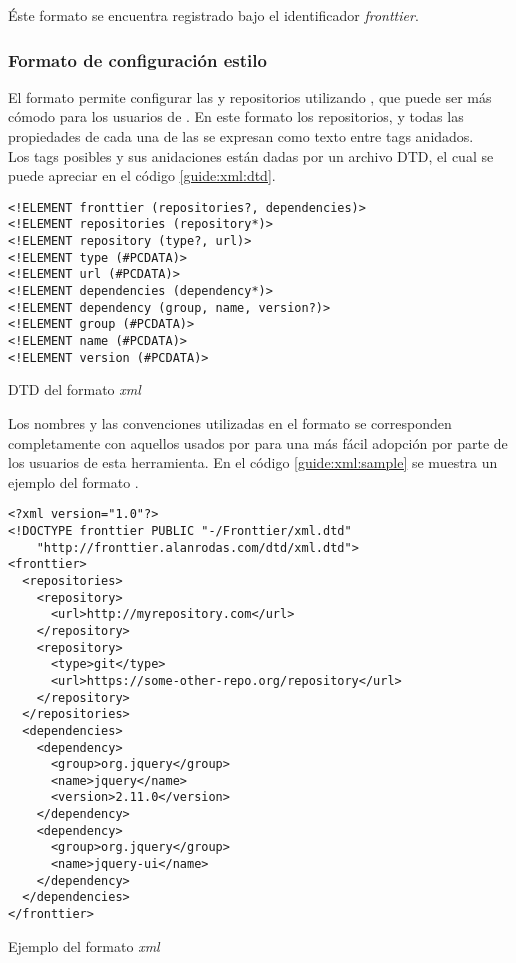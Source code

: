 Éste formato se encuentra registrado bajo el identificador \emph{fronttier}.

\subsubsection{Formato de configuración estilo \maven}
\label{subsubsec:formats:mvn}

El formato \xml permite configurar las \dependencies y repositorios utilizando 
\xml, que puede ser más cómodo para los usuarios de \maven. En este 
formato los repositorios, \dependencies y todas las propiedades de cada una de 
las \dependencies se expresan como texto entre tags \xml anidados.\\
Los tags posibles y sus anidaciones están dadas por un archivo DTD, el cual se 
puede apreciar en el código \ref{guide:xml:dtd}.

\begin{listing}[ht]
	\begin{verbatim}
<!ELEMENT fronttier (repositories?, dependencies)>
<!ELEMENT repositories (repository*)>
<!ELEMENT repository (type?, url)>
<!ELEMENT type (#PCDATA)>
<!ELEMENT url (#PCDATA)>
<!ELEMENT dependencies (dependency*)>
<!ELEMENT dependency (group, name, version?)>
<!ELEMENT group (#PCDATA)>
<!ELEMENT name (#PCDATA)>
<!ELEMENT version (#PCDATA)>
	\end{verbatim}
	\caption{DTD del formato \emph{xml}}
	\label{guide:xml:dtd}
\end{listing}

Los nombres y las convenciones utilizadas en el formato se corresponden 
completamente con aquellos usados por \apache \maven para una más fácil 
adopción por parte de los usuarios de esta herramienta. En el código 
\ref{guide:xml:sample} se muestra un ejemplo del formato .

\begin{listing}[ht]
	\begin{verbatim}
<?xml version="1.0"?>
<!DOCTYPE fronttier PUBLIC "-/Fronttier/xml.dtd"
    "http://fronttier.alanrodas.com/dtd/xml.dtd">
<fronttier>
  <repositories>
    <repository>
      <url>http://myrepository.com</url>
    </repository>
    <repository>
      <type>git</type>
      <url>https://some-other-repo.org/repository</url>
    </repository>
  </repositories>
  <dependencies>
    <dependency>
      <group>org.jquery</group>
      <name>jquery</name>
      <version>2.11.0</version>
    </dependency>
    <dependency>
      <group>org.jquery</group>
      <name>jquery-ui</name>
    </dependency>
  </dependencies>
</fronttier>
	\end{verbatim}
	\caption{Ejemplo del formato \emph{xml}}
	\label{guide:xml:sample}
\end{listing}


